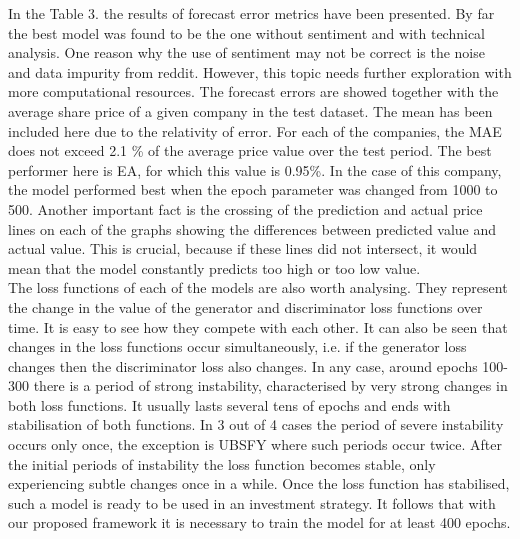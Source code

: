 \documentclass[11pt]{article} %
\begin{document}
In the Table 3. the results of forecast error metrics have been presented. By far the best model was found to be the one without sentiment and with technical analysis. One reason why the use of sentiment may not be correct is the noise and data impurity from reddit. However, this topic needs further exploration with more computational resources. 
The forecast errors are showed together with the average share price of a given company in the test dataset. The mean has been included here due to the relativity of error. For each of the companies, the MAE does not exceed 2.1 \% of the average price value over the test period. The best performer here is EA, for which this value is 0.95\%.  In the case of this company, the model performed best when the epoch parameter was changed from 1000 to 500. Another important fact is the crossing of the prediction and actual price lines on each of the graphs showing the differences between predicted value and actual value. This is crucial, because if these lines did not intersect, it would mean that the model constantly predicts too high or too low value.\\

The loss functions of each of the models are also worth analysing. They represent the change in the value of the generator and discriminator loss functions over time. It is easy to see how they compete with each other. It can also be seen that changes in the loss functions occur simultaneously, i.e. if the generator loss changes then the discriminator loss also changes. In any case, around epochs 100-300 there is a period of strong instability, characterised by very strong changes in both loss functions. It usually lasts several tens of epochs and ends with stabilisation of both functions. In 3 out of 4 cases the period of severe instability occurs only once, the exception is UBSFY where such periods occur twice. After the initial periods of instability the loss function becomes stable, only experiencing subtle changes once in a while. Once the loss function has stabilised, such a model is ready to be used in an investment strategy. It follows that with our proposed framework it is necessary to train the model for at least 400 epochs. 
\end{document}

